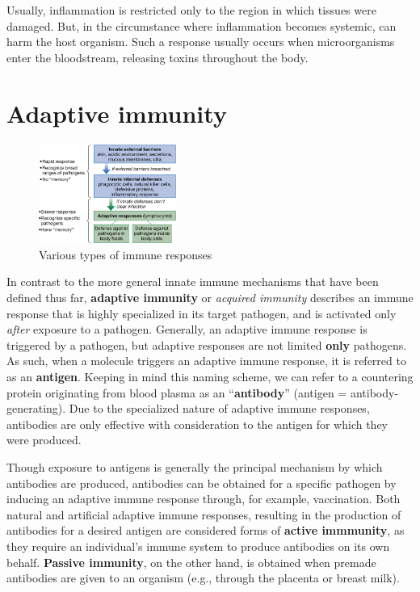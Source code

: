 \documentclass{article}
\begin{document}
Usually, inflammation is restricted only to the region in which tissues were
damaged. But, in the circumstance where inflammation becomes systemic, can
harm the host organism. Such a response usually occurs when microorganisms
enter the bloodstream, releasing toxins throughout the body.

\section{Adaptive immunity}

\begin{figure}
	\begin{center}
		\includegraphics[width=0.4\textwidth]{response_table.png}
	\end{center}
	\caption{Various types of immune responses}
\end{figure}

In contrast to the more general innate immune mechanisms that have been defined
thus far, \textbf{adaptive immunity} or \emph{acquired immunity} describes an
immune response that is highly specialized in its target pathogen, and is
activated only \emph{after} exposure to a pathogen. Generally, an adaptive
immune response is triggered by a pathogen, but adaptive responses are not
limited \textbf{only} pathogens. As such, when a molecule triggers an adaptive
immune response, it is referred to as an \textbf{antigen}. Keeping in mind this
naming scheme, we can refer to a countering protein originating from blood plasma
as an ``\textbf{antibody}'' (antigen = antibody-generating). Due to the
specialized nature of adaptive immune responses, antibodies are only effective
with consideration to the antigen for which they were produced.

Though exposure to antigens is generally the principal mechanism by which
antibodies are produced, antibodies can be obtained for a specific pathogen by
inducing an adaptive immune response through, for example, vaccination. Both
natural and artificial adaptive immune responses, resulting in the production
of antibodies for a desired antigen are considered forms of \textbf{active
immmunity}, as they require an individual's immune system to produce antibodies
on its own behalf. \textbf{Passive immunity}, on the other hand, is obtained
when premade antibodies are given to an organism (e.g., through the placenta or
breast milk).
\end{document}
